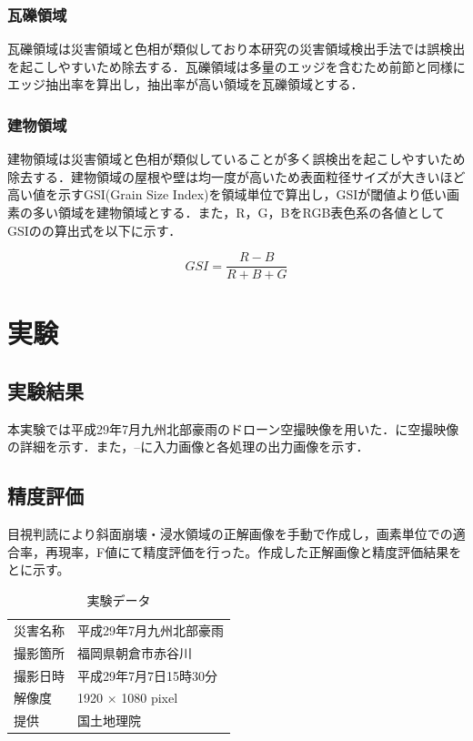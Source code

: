 \documentclass[a4paper, twocolumn, xelatex, 9pt, ja=standard, Ligatures=TeX]{bxjsarticle}
\begin{document}
\subsubsection{瓦礫領域}
	瓦礫領域は災害領域と色相が類似しており本研究の災害領域検出手法では誤検出を起こしやすいため除去する．瓦礫領域は多量のエッジを含むため前節と同様にエッジ抽出率を算出し，抽出率が高い領域を瓦礫領域とする．

\subsubsection{建物領域}
	建物領域は災害領域と色相が類似していることが多く誤検出を起こしやすいため除去する．建物領域の屋根や壁は均一度が高いため表面粒径サイズが大きいほど高い値を示すGSI(Grain Size Index)を領域単位で算出し，GSIが閾値より低い画素の多い領域を建物領域とする．また，R，G，BをRGB表色系の各値としてGSIのの算出式を以下に示す．

	\begin{equation}
		GSI = \frac{R-B}{R+B+G}
	\end{equation}


\section{実験}
\subsection{実験結果}
	本実験では平成29年7月九州北部豪雨のドローン空撮映像\cite{web01}を用いた．に空撮映像の詳細を示す．また，--に入力画像と各処理の出力画像を示す．
\subsection{精度評価}
	目視判読により斜面崩壊・浸水領域の正解画像を手動で作成し，画素単位での適合率，再現率，F値にて精度評価を行った。作成した正解画像と精度評価結果をとに示す。

	\begin{table}[h]
		\centering
		\caption{実験データ}
		\label{tab03}
		\begin{tabular}{l l}
			\hline
			災害名称 & 平成29年7月九州北部豪雨 \\
			撮影箇所 & 福岡県朝倉市赤谷川 \\
			撮影日時 & 平成29年7月7日15時30分 \\
			解像度 & 1920 × 1080 pixel \\
			提供 & 国土地理院 \\ \hline
		\end{tabular}
	\end{table}
	
\end{document}
